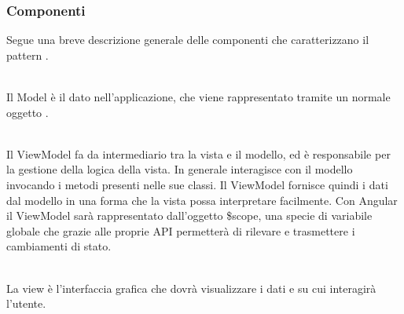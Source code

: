 \documentclass[a4paper, titlepage]{article}
\begin{document}
\subsubsection{Componenti}
Segue una breve descrizione generale delle componenti che caratterizzano il pattern .

\begin{description}
\item{} 
\\ Il Model è il dato nell’applicazione, che viene rappresentato tramite un normale oggetto .
\item{}
\\ Il ViewModel fa da intermediario tra la vista e il modello, ed è responsabile per la gestione della logica della vista. In generale interagisce con il modello invocando i metodi presenti nelle sue classi.
Il ViewModel fornisce quindi i dati dal modello in una forma che la vista possa interpretare facilmente.
\newline Con Angular il ViewModel sarà rappresentato dall’oggetto \$scope, una specie di variabile globale  che grazie alle proprie API permetterà di rilevare e trasmettere i cambiamenti di stato.
\item{}
\\ La view è l’interfaccia grafica che dovrà visualizzare i dati e su cui interagirà l'utente.
\end{description}
\end{document}
